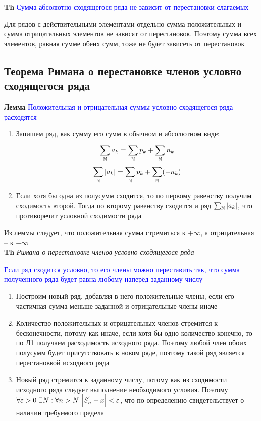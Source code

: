 \textbf{Th} \textcolor{blue}{Сумма абсолютно сходящегося ряда не зависит от перестановки слагаемых}

Для рядов с действительными элементами отдельно сумма положительных и сумма отрицательных элементов не
зависят от перестановок.
Поэтому сумма всех элементов, равная сумме обеих сумм, тоже не будет зависеть от перестановок

\subsection{Теорема Римана о перестановке членов условно сходящегося ряда}

\textbf{Лемма} \textcolor{blue}{Положительная и отрицательная суммы условно сходящегося ряда расходятся}

\begin{enumerate}
    \item Запишем ряд, как сумму его сумм в обычном и абсолютном виде:
    \begin{gather*}
        \sum_{\mathbb{N}}^{}a_k = \sum_{\mathbb{N}}^{}p_k + \sum_{\mathbb{N}}^{}n_k\\
        \sum_{\mathbb{N}}^{} \abs{a_k} = \sum_{\mathbb{N}}^{}p_k + \sum_{\mathbb{N}}^{}(-n_k)
    \end{gather*}
    \item Если хотя бы одна из полусумм сходится, то по первому равенству получим сходимость второй.
    Тогда по второму равенству сходится и ряд $\sum_{\mathbb{N}}^{} \abs{a_k}$, что противоречит условной сходимости ряда
\end{enumerate}

Из леммы следует, что положительная сумма стремиться к $+\infty$, а отрицательная -- к $-\infty$ \\

\textbf{Th} \textit{Римана о перестановке членов условно сходящегося ряда}

\textcolor{blue}{Если ряд сходится условно, то его члены можно переставить так, что сумма полученного ряда будет
равна любому наперёд заданному числу}

\begin{enumerate}
    \item Построим новый ряд, добавляя в него положительные члены, если его частичная сумма меньше заданной и
    отрицательные члены иначе
    \item Количество положительных и отрицательных членов стремится к бесконечности, потому как иначе, если хотя
    бы одно количество конечно, то по Л1 получаем расходимость исходного ряда.
    Поэтому любой член обоих полусумм будет присутствовать в новом ряде, поэтому такой ряд является перестановкой исходного ряда
    \item Новый ряд стремится к заданному числу, потому как из сходимости исходного ряда следует выполнение
    необходимого условия.
    Поэтому $\forall \varepsilon > 0~\exists N: \forall n > N~\abs{S^{'}_n - x} < \varepsilon$,
    что по определению свидетельствует о наличии требуемого предела
\end{enumerate}

